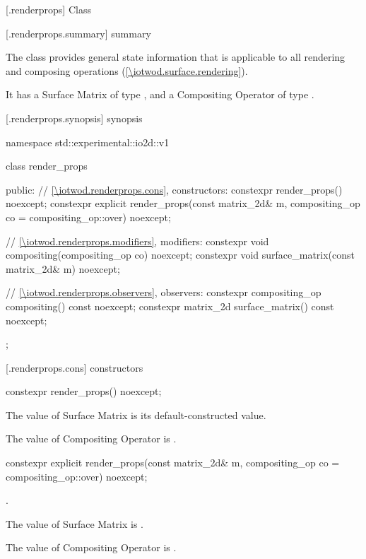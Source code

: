 
 [\iotwod.renderprops] {Class }

 [\iotwod.renderprops.summary] { summary}

\pnum
The  class provides general state information that is applicable to all rendering and composing operations (\ref{\iotwod.surface.rendering}).

\pnum
It has a Surface Matrix of type , and a Compositing Operator of type .

 [\iotwod.renderprops.synopsis] { synopsis}

\begin{codeblock}
namespace std::experimental::io2d::v1 {
  class render_props {
  public:
    // \ref{\iotwod.renderprops.cons}, constructors:
    constexpr render_props() noexcept;
    constexpr explicit render_props(const matrix_2d& m,
      compositing_op co = compositing_op::over) noexcept;
    
    // \ref{\iotwod.renderprops.modifiers}, modifiers:
    constexpr void compositing(compositing_op co) noexcept;
    constexpr void surface_matrix(const matrix_2d& m) noexcept;
    
    // \ref{\iotwod.renderprops.observers}, observers:
    constexpr compositing_op compositing() const noexcept;
    constexpr matrix_2d surface_matrix() const noexcept;
  };
}
\end{codeblock}

 [\iotwod.renderprops.cons] { constructors}

\begin{itemdecl}
constexpr render_props() noexcept;
\end{itemdecl}
\begin{itemdescr}
\pnum
\effects
The value of Surface Matrix is its default-constructed value.

\pnum
The value of Compositing Operator is .
\end{itemdescr}

\begin{itemdecl}
constexpr explicit render_props(const matrix_2d& m,
  compositing_op co = compositing_op::over) noexcept;
\end{itemdecl}
\begin{itemdescr}
\pnum
\requires
{}.

\pnum
\effects
The value of Surface Matrix is .

\pnum
The value of Compositing Operator is .
\end{itemdescr}

